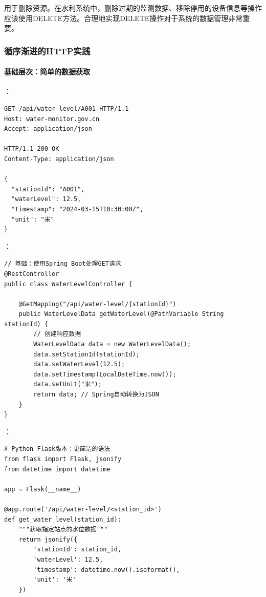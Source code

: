 用于删除资源。在水利系统中，删除过期的监测数据、移除停用的设备信息等操作应该使用DELETE方法。合理地实现DELETE操作对于系统的数据管理非常重要。

\hypertarget{ux5faaux5e8fux6e10ux8fdbux7684httpux5b9eux8df5}{%
\subsubsection{循序渐进的HTTP实践}\label{ux5faaux5e8fux6e10ux8fdbux7684httpux5b9eux8df5}}

\hypertarget{ux57faux7840ux5c42ux6b21ux7b80ux5355ux7684ux6570ux636eux83b7ux53d6}{%
\paragraph{基础层次：简单的数据获取}\label{ux57faux7840ux5c42ux6b21ux7b80ux5355ux7684ux6570ux636eux83b7ux53d6}}

：

\begin{lstlisting}
GET /api/water-level/A001 HTTP/1.1
Host: water-monitor.gov.cn
Accept: application/json

HTTP/1.1 200 OK
Content-Type: application/json

{
  "stationId": "A001",
  "waterLevel": 12.5,
  "timestamp": "2024-03-15T10:30:00Z",
  "unit": "米"
}
\end{lstlisting}

：

\begin{lstlisting}[style=java]
// 基础：使用Spring Boot处理GET请求
@RestController
public class WaterLevelController {
    
    @GetMapping("/api/water-level/{stationId}")
    public WaterLevelData getWaterLevel(@PathVariable String stationId) {
        // 创建响应数据
        WaterLevelData data = new WaterLevelData();
        data.setStationId(stationId);
        data.setWaterLevel(12.5);
        data.setTimestamp(LocalDateTime.now());
        data.setUnit("米");
        return data; // Spring自动转换为JSON
    }
}
\end{lstlisting}

：

\begin{lstlisting}[style=python]
# Python Flask版本：更简洁的语法
from flask import Flask, jsonify
from datetime import datetime

app = Flask(__name__)

@app.route('/api/water-level/<station_id>')
def get_water_level(station_id):
    """获取指定站点的水位数据"""
    return jsonify({
        'stationId': station_id,
        'waterLevel': 12.5,
        'timestamp': datetime.now().isoformat(),
        'unit': '米'
    })
\end{lstlisting}

